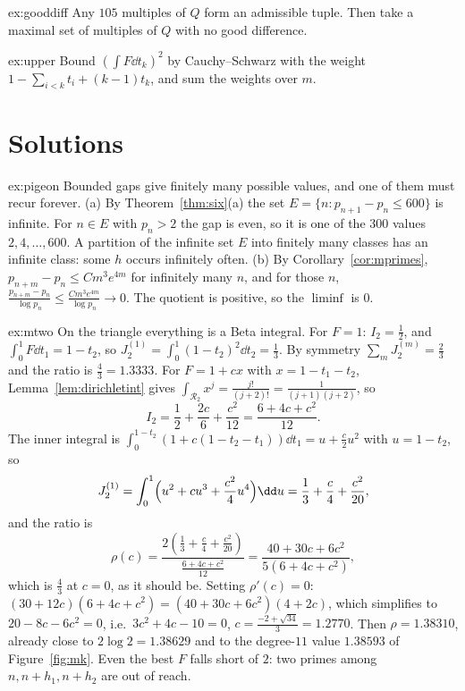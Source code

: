 \begin{hint}{ex:gooddiff}
Any $105$ multiples of $Q$ form an admissible tuple. Then take a maximal set of multiples of $Q$ with no good difference.
\end{hint}

\begin{hint}{ex:upper}
Bound $(\int F\dd t_k)^2$ by Cauchy--Schwarz with the weight $1-\sum_{i<k}t_i+(k-1)t_k$, and sum the weights over $m$.
\end{hint}

\section{Solutions}

\begin{solution}{ex:pigeon}
\idea Bounded gaps give finitely many possible values, and one of them must recur forever.
\writeup (a) By Theorem~\ref{thm:six}(a) the set $E=\{n:p_{n+1}-p_n\le600\}$ is infinite. For $n\in E$ with $p_n>2$ the gap is even, so it is one of the $300$ values $2,4,\dots,600$. A partition of the infinite set $E$ into finitely many classes has an infinite class: some $h$ occurs infinitely often.
(b) By Corollary~\ref{cor:mprimes}, $p_{n+m}-p_n\le Cm^3e^{4m}$ for infinitely many $n$, and for those $n$, $\frac{p_{n+m}-p_n}{\log p_n}\le\frac{Cm^3e^{4m}}{\log p_n}\to0$. The quotient is positive, so the $\liminf$ is $0$.
\end{solution}

\begin{solution}{ex:mtwo}
\idea On the triangle everything is a Beta integral.
\writeup For $F=1$: $I_2=\frac12$, and $\int_0^1F\dd t_1=1-t_2$, so $J_2^{(1)}=\int_0^1(1-t_2)^2\dd t_2=\frac13$. By symmetry $\sum_mJ_2^{(m)}=\frac23$ and the ratio is $\frac43=1.3333$. For $F=1+cx$ with $x=1-t_1-t_2$, Lemma~\ref{lem:dirichletint} gives $\int_{\mathcal R_2}x^j=\frac{j!}{(j+2)!}=\frac1{(j+1)(j+2)}$, so
\[
I_2=\frac12+\frac{2c}6+\frac{c^2}{12}=\frac{6+4c+c^2}{12}.
\]
The inner integral is $\int_0^{1-t_2}(1+c(1-t_2-t_1))\dd t_1=u+\frac c2u^2$ with $u=1-t_2$, so
\[
J_2^{(1)}=\int_0^1\Bigl(u^2+cu^3+\frac{c^2}4u^4\Bigr)\dd u=\frac13+\frac c4+\frac{c^2}{20},
\]
and the ratio is
\[
\rho(c)=\frac{2(\frac13+\frac c4+\frac{c^2}{20})}{\frac{6+4c+c^2}{12}}=\frac{40+30c+6c^2}{5(6+4c+c^2)},
\]
which is $\frac43$ at $c=0$, as it should be. Setting $\rho'(c)=0$: $(30+12c)(6+4c+c^2)=(40+30c+6c^2)(4+2c)$, which simplifies to $20-8c-6c^2=0$, i.e.\ $3c^2+4c-10=0$, $c=\frac{-2+\sqrt{34}}3=1.2770$. Then $\rho=1.38310$, already close to $2\log2=1.38629$ and to the degree-$11$ value $1.38593$ of Figure~\ref{fig:mk}. Even the best $F$ falls short of $2$: two primes among $n,n+h_1,n+h_2$ are out of reach.
\end{solution}

